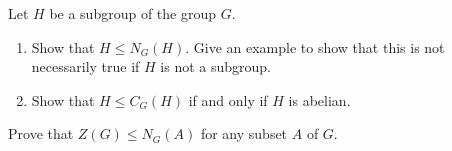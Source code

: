 \documentclass[
    11pt,a4paper,
]{exam}
\begin{document}
\begin{questions}
    
    
    \question Let \(H\) be a subgroup of the group \(G\).
    \begin{enumerate}[label=(\alph*)]
        \item Show that \(H \leq N_G(H)\). Give an example to show that this is not necessarily true if \(H\) is not a subgroup.
        \item Show that \(H \leq C_G(H)\) if and only if \(H\) is abelian.
    \end{enumerate}
    
    
    
    
    
    
    
    
    
    
    
    
    \question
    Prove that \(Z(G) \leq N_G(A)\) for any subset \(A\) of \(G\).
    
    
    \end{questions}
\end{document}
